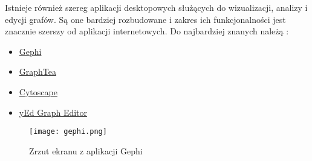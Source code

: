Istnieje również szereg aplikacji desktopowych służących do wizualizacji, analizy i edycji grafów. Są one bardziej rozbudowane i zakres ich funkcjonalności jest znacznie szerszy od aplikacji internetowych. Do najbardziej znanych należą \cite{mathex-desktop}:

\begin{itemize}
\setlength\itemsep{0em}
\item \href{https://gephi.org/}{Gephi}
\item \href{http://www.graphtheorysoftware.com/}{GraphTea}
\item \href{http://www.cytoscape.org/}{Cytoscape}
\item \href{https://www.yworks.com}{yEd Graph Editor}
\end{itemize}

\begin{figure}[H]
\centering
\texttt{[image: gephi.png]}
\caption{Zrzut ekranu z aplikacji Gephi}
\end{figure}
